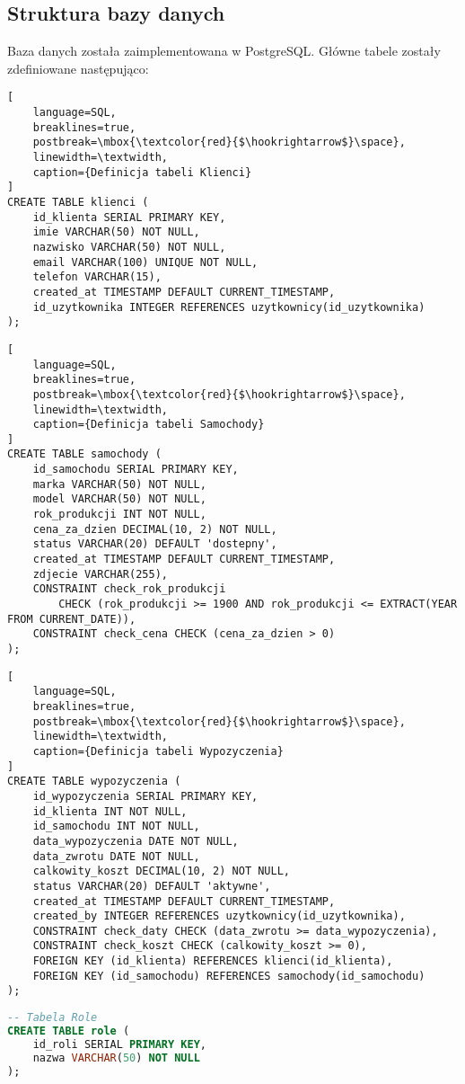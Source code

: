 \documentclass[12pt]{article}
\begin{document}
\subsection{Struktura bazy danych}
Baza danych została zaimplementowana w PostgreSQL. Główne tabele zostały zdefiniowane następująco:
\begin{enumerate}
\begin{lstlisting}[
    language=SQL,
    breaklines=true,
    postbreak=\mbox{\textcolor{red}{$\hookrightarrow$}\space},
    linewidth=\textwidth,
    caption={Definicja tabeli Klienci}
]
CREATE TABLE klienci (
    id_klienta SERIAL PRIMARY KEY,
    imie VARCHAR(50) NOT NULL,
    nazwisko VARCHAR(50) NOT NULL,
    email VARCHAR(100) UNIQUE NOT NULL,
    telefon VARCHAR(15),
    created_at TIMESTAMP DEFAULT CURRENT_TIMESTAMP,
    id_uzytkownika INTEGER REFERENCES uzytkownicy(id_uzytkownika)
);
\end{lstlisting}
\newpage
\begin{lstlisting}[
    language=SQL,
    breaklines=true,
    postbreak=\mbox{\textcolor{red}{$\hookrightarrow$}\space},
    linewidth=\textwidth,
    caption={Definicja tabeli Samochody}
]
CREATE TABLE samochody (
    id_samochodu SERIAL PRIMARY KEY,
    marka VARCHAR(50) NOT NULL,
    model VARCHAR(50) NOT NULL,
    rok_produkcji INT NOT NULL,
    cena_za_dzien DECIMAL(10, 2) NOT NULL,
    status VARCHAR(20) DEFAULT 'dostepny',
    created_at TIMESTAMP DEFAULT CURRENT_TIMESTAMP,
    zdjecie VARCHAR(255),
    CONSTRAINT check_rok_produkcji 
        CHECK (rok_produkcji >= 1900 AND rok_produkcji <= EXTRACT(YEAR FROM CURRENT_DATE)),
    CONSTRAINT check_cena CHECK (cena_za_dzien > 0)
);
\end{lstlisting}

\begin{lstlisting}[
    language=SQL,
    breaklines=true,
    postbreak=\mbox{\textcolor{red}{$\hookrightarrow$}\space},
    linewidth=\textwidth,
    caption={Definicja tabeli Wypozyczenia}
]
CREATE TABLE wypozyczenia (
    id_wypozyczenia SERIAL PRIMARY KEY,
    id_klienta INT NOT NULL,
    id_samochodu INT NOT NULL,
    data_wypozyczenia DATE NOT NULL,
    data_zwrotu DATE NOT NULL,
    calkowity_koszt DECIMAL(10, 2) NOT NULL,
    status VARCHAR(20) DEFAULT 'aktywne',
    created_at TIMESTAMP DEFAULT CURRENT_TIMESTAMP,
    created_by INTEGER REFERENCES uzytkownicy(id_uzytkownika),
    CONSTRAINT check_daty CHECK (data_zwrotu >= data_wypozyczenia),
    CONSTRAINT check_koszt CHECK (calkowity_koszt >= 0),
    FOREIGN KEY (id_klienta) REFERENCES klienci(id_klienta),
    FOREIGN KEY (id_samochodu) REFERENCES samochody(id_samochodu)
);
\end{lstlisting}
\newpage
\begin{lstlisting}[language=SQL]
-- Tabela Role
CREATE TABLE role (
    id_roli SERIAL PRIMARY KEY,
    nazwa VARCHAR(50) NOT NULL
);
\end{lstlisting}


\end{enumerate}
\end{document}
